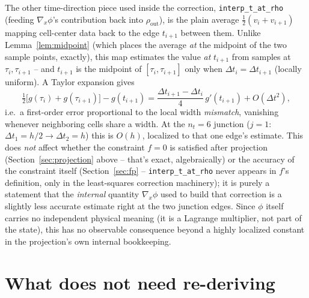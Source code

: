 \documentclass[11pt]{article}
\newcommand{\dt}{\Delta t}
\newcommand{\h}{h}
\newcommand{\code}[1]{\texttt{#1}}
\begin{document}
The other time-direction piece used inside the correction, \code{interp\_t\_at\_rho}
(feeding $\nabla_x\phi$'s contribution back into $\rho_{\mathrm{out}}$), is the plain
average $\tfrac12(v_i+v_{i+1})$ mapping cell-center data back to the edge $t_{i+1}$
between them. Unlike Lemma~\ref{lem:midpoint} (which places the average \emph{at} the
midpoint of the two sample points, exactly), this map estimates the value \emph{at}
$t_{i+1}$ from samples at $\tau_i,\tau_{i+1}$ -- and $t_{i+1}$ is the midpoint of
$[\tau_i,\tau_{i+1}]$ only when $\Delta t_i=\Delta t_{i+1}$ (locally uniform). A Taylor
expansion gives
\begin{equation}
  \tfrac12\bigl[g(\tau_i)+g(\tau_{i+1})\bigr] - g(t_{i+1})
  = \frac{\Delta t_{i+1}-\Delta t_i}{4}\,g'(t_{i+1}) + O(\dt^2),
\end{equation}
i.e.\ a first-order error proportional to the local width \emph{mismatch}, vanishing
whenever neighboring cells share a width. At the $n_t=6$ junction ($j=1$: $\Delta
t_1=\h/2\to\Delta t_2=\h$) this is $O(\h)$, localized to that one edge's estimate. This
does \emph{not} affect whether the constraint $f=0$ is satisfied after projection
(Section~\ref{sec:projection} above -- that's exact, algebraically) or the accuracy of
the constraint itself (Section~\ref{sec:fp} -- \code{interp\_t\_at\_rho} never appears
in $f$'s definition, only in the least-squares correction machinery); it is purely a
statement that the \emph{internal} quantity $\nabla_x\phi$ used to build that
correction is a slightly less accurate estimate right at the two junction edges. Since
$\phi$ itself carries no independent physical meaning (it is a Lagrange multiplier, not
part of the state), this has no observable consequence beyond a highly localized
constant in the projection's own internal bookkeeping.

\section{What does not need re-deriving}
\end{document}
